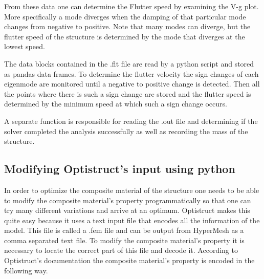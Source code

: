From these data one can determine the Flutter speed by examining the V-g
plot. More specifically a mode diverges when the damping of that
particular mode changes from negative to positive. Note that many modes
can diverge, but the flutter speed of the structure is determined by the
mode that diverges at the lowest speed.

The data blocks contained in the .flt file are read by a python script
and stored as pandas data frames. To determine the flutter velocity the
sign changes of each eigenmode are monitored until a negative to
positive change is detected. Then all the points where there is such a
sign change are stored and the flutter speed is determined by the
minimum speed at which such a sign change occurs.

A separate function is responsible for reading the .out file and
determining if the solver completed the analysis successfully as well as
recording the mass of the structure.

\subsection{Modifying Optistruct's input using
python}\label{modifying-optistructs-input-using-python}

In order to optimize the composite material of the structure one needs
to be able to modify the composite material's property programmatically
so that one can try many different variations and arrive at an optimum.
Optistruct makes this quite easy because it uses a text input file that
encodes all the information of the model. This file is called a .fem
file and can be output from HyperMesh as a comma separated text file. To
modify the composite material's property it is necessary to locate the
correct part of this file and decode it. According to Optistruct's
documentation the composite material's property is encoded in the
following way.

\begin{table}[h]
  \centering
  \caption{Table Fitted to Page Width}
\end{table}


